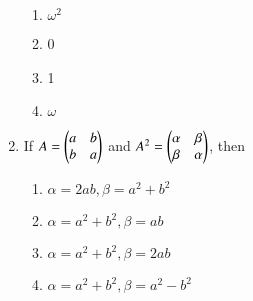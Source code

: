 \documentclass[journal,12pt,twocolumn]{IEEEtran}
\theoremstyle{remark}
\begin{document}
\begin{enumerate}
        \hfill{}
        
        \begin{enumerate}[label=(\alph*)]
		\item $\omega^{2}$ 
                \item 0                      
                \item 1
                \item $\omega$
        \end{enumerate}


\item
        If $A=\begin{pmatrix}a & b \\ b & a\end{pmatrix}$ and $A^{2}=\begin{pmatrix}\alpha & \beta \\ \beta & \alpha\end{pmatrix}$, then 
        
        \hfill{}
                                             
        \begin{enumerate}[label=(\alph*)]
		\item $\alpha=2ab, \beta=a^{2}+b^{2}$
                \item $\alpha=a^{2}+b^{2}, \beta=ab$
                \item $\alpha=a^{2}+b^{2}, \beta=2ab$
                \item $\alpha=a^{2}+b^{2}, \beta=a^{2}-b^{2}$
        \end{enumerate}

		
\end{enumerate}
\end{document}
